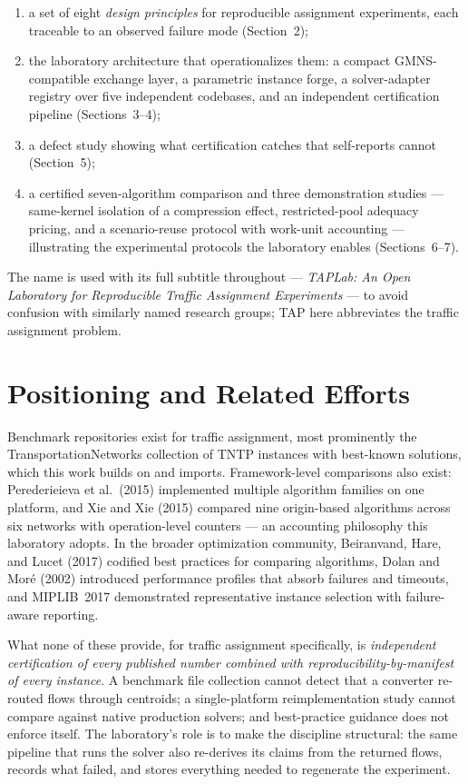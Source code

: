 \documentclass[11pt]{article}
\begin{document}
\begin{enumerate}
\item a set of eight \emph{design principles} for reproducible assignment
experiments, each traceable to an observed failure mode
(Section~2);
\item the laboratory architecture that operationalizes them: a compact
GMNS-compatible exchange layer, a parametric instance forge, a
solver-adapter registry over five independent codebases, and an
independent certification pipeline (Sections~3--4);
\item a defect study showing what certification catches that self-reports
cannot (Section~5);
\item a certified seven-algorithm comparison and three demonstration
studies --- same-kernel isolation of a compression effect, restricted-pool
adequacy pricing, and a scenario-reuse protocol with work-unit accounting
--- illustrating the experimental protocols the laboratory enables
(Sections~6--7).
\end{enumerate}

The name is used with its full subtitle throughout --- \emph{TAPLab: An
Open Laboratory for Reproducible Traffic Assignment Experiments} --- to
avoid confusion with similarly named research groups; TAP here abbreviates
the traffic assignment problem.

\section{Positioning and Related Efforts}

Benchmark repositories exist for traffic assignment, most prominently the
TransportationNetworks collection of TNTP instances with best-known
solutions, which this work builds on and imports. Framework-level
comparisons also exist: Perederieieva et al.~(2015) implemented multiple
algorithm families on one platform, and Xie and Xie (2015) compared nine
origin-based algorithms across six networks with operation-level counters
--- an accounting philosophy this laboratory adopts. In the broader
optimization community, Beiranvand, Hare, and Lucet (2017) codified best
practices for comparing algorithms, Dolan and Mor\'e (2002) introduced
performance profiles that absorb failures and timeouts, and MIPLIB~2017
demonstrated representative instance selection with failure-aware
reporting.

What none of these provide, for traffic assignment specifically, is
\emph{independent certification of every published number combined with
reproducibility-by-manifest of every instance}. A benchmark file collection
cannot detect that a converter re-routed flows through centroids; a
single-platform reimplementation study cannot compare against native
production solvers; and best-practice guidance does not enforce itself.
The laboratory's role is to make the discipline structural: the same
pipeline that runs the solver also re-derives its claims from the returned
flows, records what failed, and stores everything needed to regenerate the
experiment.
\end{document}
